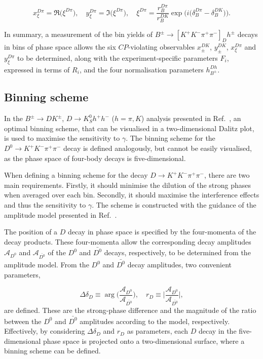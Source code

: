 \documentclass[12pt, a4paper, notitlepage, onecolumn]{article}
\begin{document}
\begin{equation}
    x_\xi^{D\pi} = \Re\big(\xi^{D\pi}\big), \quad y_\xi^{D\pi} = \Im\big(\xi^{D\pi}\big), \quad \xi^{D\pi} = \frac{r_B^{D\pi}}{r_B^{DK}}\exp\Big(i\big(\delta_B^{D\pi} - \delta_B^{DK}\big)\Big).
\end{equation}

In summary, a measurement of the bin yields of $B^\pm\to[K^+K^-\pi^+\pi^-]_D h^\pm$ decays in bins of phase space allows the six $C\!P$-violating observables $x_\pm^{DK}$, $y_\pm^{DK}$, $x_\xi^{D\pi}$ and $y_\xi^{D\pi}$ to be determined, along with the experiment-specific parameters $F_i$, expressed in terms of $R_i$, and the four normalisation parameters $h_{B^\pm}^{D h}$.

\subsection{Binning scheme}
\label{section_binning_scheme}
In the $B^\pm\to DK^\pm$, $D\to K^0_S h^+h^-$ ($h=\pi, K$) analysis presented in Ref.~\cite{LHCb-PAPER-2020-019}, an optimal binning scheme, that can be visualised in a two-dimensional Dalitz plot, is used to maximise the sensitivity to $\gamma$. The binning scheme for the $D^0\to K^+K^-\pi^+\pi^-$ decay is defined analogously, but cannot be easily visualised, as the phase space of four-body decays is five-dimensional.

When defining a binning scheme for the decay $D\to K^+K^-\pi^+\pi^-$, there are two main requirements. Firstly, it should minimise the dilution of the strong phases when averaged over each bin. Secondly, it should maximise the interference effects and thus the sensitivity to $\gamma$. The scheme is constructed with the guidance   of the amplitude model presented in Ref.~\cite{LHCb-PAPER-2018-041}.
 
The position of a $D$ decay in phase space is specified by the four-momenta of the decay products.  These four-momenta allow the corresponding decay amplitudes $\mathcal{A}_{D^0}$ and $\mathcal{A}_{\bar{D^0}}$ of the $D^0$ and $\bar{D^0}$ decays, respectively, to be determined from the amplitude model.  From the $D^0$ and $\bar{D^0}$ decay amplitudes, two convenient parameters,

\begin{equation}
    \Delta\delta_D\equiv\arg\Big(\frac{\mathcal{A}_{D^0}}{\mathcal{A}_{\bar{D^0}}}\Big), \quad r_D\equiv\Big\lvert\frac{\mathcal{A}_{D^0}}{\mathcal{A}_{\bar{D^0}}}\Big\rvert,
\end{equation}
are defined. These are the strong-phase difference and the magnitude of the ratio between the $D^0$ and $\bar{D^0}$ amplitudes according to the model, respectively. Effectively, by considering $\Delta\delta_D$ and $r_D$ as parameters, each $D$ decay in the five-dimensional phase space is projected onto a two-dimensional surface, where a binning scheme can be defined.
\end{document}
